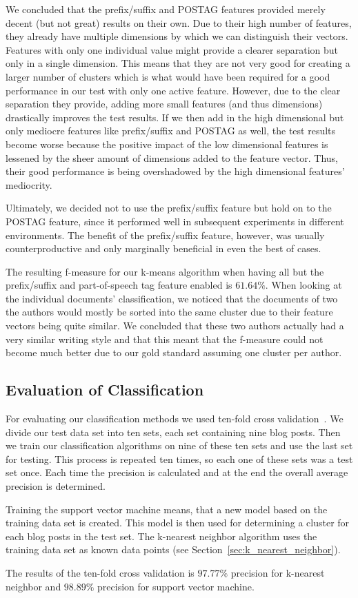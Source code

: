 We concluded that the prefix/suffix and POSTAG features provided merely decent (but not great) results on their own.
Due to their high number of features, they already have multiple dimensions by which we can distinguish their vectors.
Features with only one individual value might provide a clearer separation but only in a single dimension.
This means that they are not very good for creating a larger number of clusters which is what would have been required for a good performance in our test with only one active feature.
However, due to the clear separation they provide, adding more small features (and thus dimensions) drastically improves the test results.
If we then add in the high dimensional but only mediocre features like prefix/suffix and POSTAG as well, the test results become worse because the positive impact of the low dimensional features is lessened by the sheer amount of dimensions added to the feature vector.
Thus, their good performance is being overshadowed by the high dimensional features' mediocrity.


Ultimately, we decided not to use the prefix/suffix feature but hold on to the POSTAG feature, since it performed well in subsequent experiments in different environments.
The benefit of the prefix/suffix feature, however, was usually counterproductive and only marginally beneficial in even the best of cases.


The resulting f-measure for our k-means algorithm when having all but the prefix/suffix and part-of-speech tag feature enabled is $61.64\%$.
When looking at the individual documents' classification, we noticed that the documents of two the authors would mostly be sorted into the same cluster due to their feature vectors being quite similar.
We concluded that these two authors actually had a very similar writing style and that this meant that the f-measure could not become much better due to our gold standard assuming one cluster per author.


\subsection{Evaluation of Classification}


For evaluating our classification methods we used ten-fold cross validation~\cite{kohavi1995study}.
We divide our test data set into ten sets, each set containing nine blog posts.
Then we train our classification algorithms on nine of these ten sets and use the last set for testing.
This process is repeated ten times, so each one of these sets was a test set once.
Each time the precision is calculated and at the end the overall average precision is determined.


Training the support vector machine means, that a new model based on the training data set is created.
This model is then used for determining a cluster for each blog posts in the test set.
The k-nearest neighbor algorithm uses the training data set as known data points (see Section~\ref{sec:k_nearest_neighbor}).


The results of the ten-fold cross validation is $97.77\%$ precision for k-nearest neighbor and $98.89\%$ precision for support vector machine.
